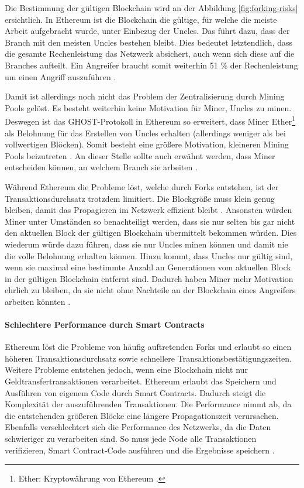Die Bestimmung der gültigen Blockchain wird an der Abbildung \ref{fig:forking-risks} ersichtlich. In Ethereum ist die Blockchain die gültige, für welche die meiste Arbeit aufgebracht wurde, unter Einbezug der Uncles. Das führt dazu, dass der Branch mit den meisten Uncles bestehen bleibt. Dies bedeutet letztendlich, dass die gesamte Rechenleistung das Netzwerk absichert, auch wenn sich diese auf die Branches aufteilt. Ein Angreifer braucht somit weiterhin 51 \% der Rechenleistung um einen Angriff auszuführen \cite{SompolinskyAcceleratingBitcoinTransaction2013}.

Damit ist allerdings noch nicht das Problem der Zentralisierung durch Mining Pools gelöst. Es besteht weiterhin keine Motivation für Miner, Uncles zu minen. Deswegen ist das GHOST-Protokoll in Ethereum so erweitert, dass Miner Ether\footnote{Ether: Kryptowährung von Ethereum \cite{EthereumTeamEthereumWhitePaper2017}.} als Belohnung für das Erstellen von Uncles erhalten (allerdings weniger als bei vollwertigen Blöcken). Somit besteht eine größere Motivation, kleineren Mining Pools beizutreten \cite{EthereumTeamEthereumWhitePaper2017}. An dieser Stelle sollte auch erwähnt werden, dass Miner entscheiden können, an welchem Branch sie arbeiten \cite{ZhengBlockchainChallengesOpportunities2017}.

Während Ethereum die Probleme löst, welche durch Forks entstehen, ist der Transaktionsdurchsatz trotzdem limitiert. Die Blockgröße muss klein genug bleiben, damit das Propagieren im Netzwerk effizient bleibt \cite{SchererPerformanceScalabilityBlockchain2017}. Ansonsten würden Miner unter Umständen so benachteiligt werden, dass sie nur selten bis gar nicht den aktuellen Block der gültigen Blockchain übermittelt bekommen würden. Dies wiederum würde dazu führen, dass sie nur Uncles minen können und damit nie die volle Belohnung erhalten können. Hinzu kommt, dass Uncles nur gültig sind, wenn sie maximal eine bestimmte Anzahl an Generationen vom aktuellen Block in der gültigen Blockchain entfernt sind. Dadurch haben Miner mehr Motivation ehrlich zu bleiben, da sie nicht ohne Nachteile an der Blockchain eines Angreifers arbeiten könnten \cite{EthereumTeamEthereumWhitePaper2017}.

\paragraph{Schlechtere Performance durch Smart Contracts}
Ethereum löst die Probleme von häufig auftretenden Forks und erlaubt so einen höheren Transaktionsdurchsatz sowie schnellere Transaktionsbestätigungszeiten. Weitere Probleme entstehen jedoch, wenn eine Blockchain nicht nur Geldtransfertransaktionen verarbeitet. Ethereum erlaubt das Speichern und Ausführen von eigenem Code durch Smart Contracts. Dadurch steigt die Komplexität der auszuführenden Transaktionen. Die Performance nimmt ab, da die entstehenden größeren Blöcke eine längere Propagationszeit verursachen. Ebenfalls verschlechtert sich die Performance des Netzwerks, da die Daten schwieriger zu verarbeiten sind. So muss jede Node alle Transaktionen verifizieren, Smart Contract-Code ausführen und die Ergebnisse speichern \cite{SchererPerformanceScalabilityBlockchain2017}. 


